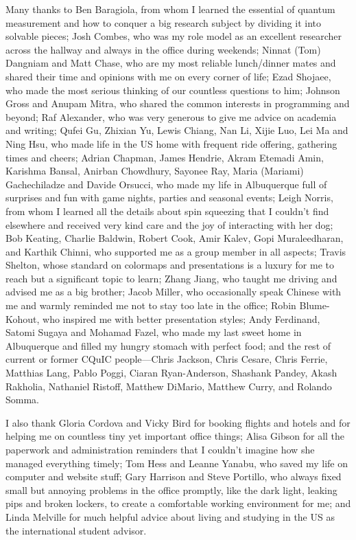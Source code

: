 \begin{acknowledgments}
Many thanks to Ben Baragiola, from whom I learned the essential of quantum measurement and how to conquer a big research subject by dividing it into solvable pieces; Josh Combes, who was my role model as an excellent researcher across the hallway and always in the office during weekends; 
Ninnat (Tom) Dangniam and Matt Chase, who are my most reliable lunch/dinner mates and shared their time and opinions with me on every corner of life; Ezad Shojaee, who made the most serious thinking of our countless questions to him; Johnson Gross and Anupam Mitra, who shared the common interests in programming and beyond; 
Raf Alexander, who was very generous to give me advice on academia and writing; Qufei Gu, Zhixian Yu, Lewis Chiang, Nan Li, Xijie Luo, Lei Ma and Ning Hsu, who made life in the US home with frequent ride offering, gathering times and cheers; 
Adrian Chapman, James Hendrie, Akram Etemadi Amin, Karishma Bansal, Anirban Chowdhury, Sayonee Ray, Maria (Mariami) Gachechiladze and Davide Orsucci, who made my life in Albuquerque full of surprises and fun with game nights, parties and seasonal events; 
Leigh Norris, from whom I learned all the details about spin squeezing that I couldn't find elsewhere and received very kind care and the joy of interacting with her dog; Bob Keating, Charlie Baldwin, Robert Cook, Amir Kalev, Gopi Muraleedharan, and Karthik Chinni, who supported me as a group member in all aspects; 
Travis Shelton, whose standard on colormaps and presentations is a luxury for me to reach but a significant topic to learn; 
Zhang Jiang, who taught me driving and advised me as a big brother; Jacob Miller, who occasionally speak Chinese with me and warmly reminded me not to stay too late in the office; 
Robin Blume-Kohout, who inspired me with better presentation styles; Andy Ferdinand, Satomi Sugaya and Mohamad Fazel, who made my last sweet home in Albuquerque and filled my hungry stomach with perfect food; 
and the rest of current or former CQuIC people---Chris Jackson, Chris Cesare, Chris Ferrie, Matthias Lang, Pablo Poggi, Ciaran Ryan-Anderson, Shashank Pandey, Akash Rakholia, Nathaniel Ristoff, Matthew DiMario, Matthew Curry, and Rolando Somma.

I also thank Gloria Cordova and Vicky Bird for booking flights and hotels and for helping me on countless tiny yet important office things; 
Alisa Gibson for all the paperwork and administration reminders that I couldn't imagine how she managed everything timely; 
Tom Hess and Leanne Yanabu, who saved my life on computer and website stuff; Gary Harrison and Steve Portillo, who always fixed small but annoying problems in the office promptly, like the dark light, leaking pips and broken lockers, to create a comfortable working environment for me; and Linda Melville for much helpful advice about living and studying in the \hbox{US} as the international student advisor.


\end{acknowledgments}
